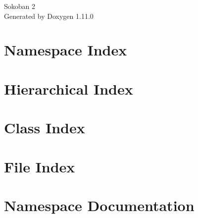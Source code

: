 \documentclass[twoside]{book}
\newcommand{\+}{\discretionary{\mbox{\scriptsize$\hookleftarrow$}}{}{}}
\newcommand{\clearemptydoublepage}{%
    \newpage{\pagestyle{empty}\cleardoublepage}%
  }
\begin{document}
  \raggedbottom
    \hypersetup{pageanchor=false,
                bookmarksnumbered=true,
                pdfencoding=unicode
               }
  \begin{titlepage}
  \vspace*{7cm}
  \begin{center}%
  {\Large Sokoban 2}\\
  \vspace*{1cm}
  {\large Generated by Doxygen 1.11.0}\\
  \end{center}
  \end{titlepage}
  \clearemptydoublepage
  \tableofcontents
  \clearemptydoublepage
  \hypersetup{pageanchor=true}
\chapter{Namespace Index}

\chapter{Hierarchical Index}

\chapter{Class Index}

\chapter{File Index}

\chapter{Namespace Documentation}





\end{document}
